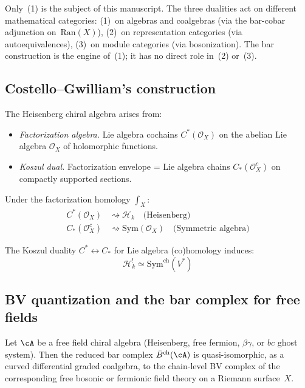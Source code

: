 Only~(1) is the subject of this manuscript.  The three dualities
act on different mathematical categories: (1)~on algebras and
coalgebras (via the bar-cobar adjunction on~$\mathrm{Ran}(X)$),
(2)~on representation categories (via autoequivalences),
(3)~on module categories (via bosonization).  The bar construction
is the engine of~(1); it has no direct role in~(2) or~(3).

\subsection{Costello--Gwilliam's construction}

\begin{theorem}
\label{thm:rhagavendran-heisenberg}
The Heisenberg chiral algebra arises from:
\begin{itemize}
\item \emph{Factorization algebra.} Lie algebra cochains $C^*(\mathcal{O}_X)$ on the
      abelian Lie algebra $\mathcal{O}_X$ of holomorphic functions.
\item \emph{Koszul dual.} Factorization envelope = Lie algebra chains $C_*(\mathcal{O}_X^c)$
      on compactly supported sections.
\end{itemize}

Under the factorization homology $\int_X$:
\begin{align*}
C^*(\mathcal{O}_X) &\rightsquigarrow \mathcal{H}_k \quad \text{(Heisenberg)} \\
C_*(\mathcal{O}_X^c) &\rightsquigarrow \text{Sym}(\mathcal{O}_X) \quad \text{(Symmetric algebra)}
\end{align*}

The Koszul duality $C^* \leftrightarrow C_*$ for Lie algebra (co)homology induces:
\[\mathcal{H}_k^! \simeq \mathrm{Sym}^{\mathrm{ch}}(V^*)\]
\end{theorem}

\subsection{BV quantization and the bar complex for free fields}
\label{sec:bv-bar-free-fields}

\begin{proposition}
\label{prop:bar-bv-free-fields}
Let $\cA$ be a free field chiral algebra \textup{(}Heisenberg, free fermion,
$\beta\gamma$, or $bc$ ghost system\textup{)}.  Then the reduced bar complex
$\bar{B}^{\mathrm{ch}}(\cA)$ is quasi-isomorphic, as a curved differential
graded coalgebra, to the chain-level BV complex of the corresponding free
bosonic or fermionic field theory on a Riemann surface~$X$.
\end{proposition}

